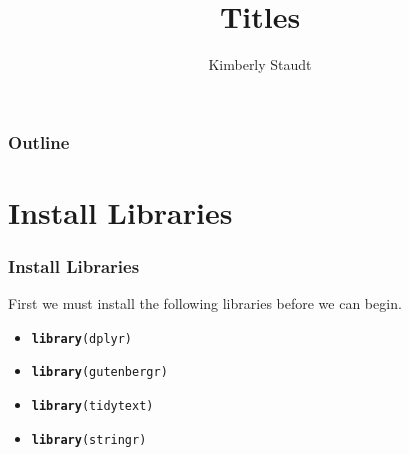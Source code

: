 \documentclass{beamer}\usepackage[]{graphicx}\usepackage[]{color}
\makeatletter
\newcommand{\hlstd}[1]{\textcolor[rgb]{0.345,0.345,0.345}{#1}}%
\newcommand{\hlkwd}[1]{\textcolor[rgb]{0.737,0.353,0.396}{\textbf{#1}}}%
\newenvironment{kframe}{%
 \def\at@end@of@kframe{}%
 \ifinner\ifhmode%
  \def\at@end@of@kframe{\end{minipage}}%
  \begin{minipage}{\columnwidth}%
 \fi\fi%
 \def\FrameCommand##1{\hskip\@totalleftmargin \hskip-\fboxsep
 \colorbox{shadecolor}{##1}\hskip-\fboxsep
     \hskip-\linewidth \hskip-\@totalleftmargin \hskip\columnwidth}%
 \MakeFramed {\advance\hsize-\width
   \@totalleftmargin\z@ \linewidth\hsize
   \@setminipage}}%
 {\par\unskip\endMakeFramed%
 \at@end@of@kframe}
\newenvironment{knitrout}{}{} %
\makeatother
\begin{document}
\title{Titles}
\author{Kimberly Staudt}

\begin{frame}
  \titlepage
\end{frame}

\begin{frame}
  \frametitle{Outline}
    \tableofcontents
\end{frame}


\section{Install Libraries}
\begin{frame}[fragile]
  \frametitle{Install Libraries}

First we must install the following libraries before we can begin. 
    \begin{itemize}
      \item
\begin{knitrout}
\color{fgcolor}\begin{kframe}
\begin{alltt}
\hlkwd{library}\hlstd{(dplyr)}
\end{alltt}
\end{kframe}
\end{knitrout}
      \item
\begin{knitrout}
\color{fgcolor}\begin{kframe}
\begin{alltt}
\hlkwd{library}\hlstd{(gutenbergr)}
\end{alltt}
\end{kframe}
\end{knitrout}
    \item
\begin{knitrout}
\color{fgcolor}\begin{kframe}
\begin{alltt}
\hlkwd{library}\hlstd{(tidytext)}
\end{alltt}
\end{kframe}
\end{knitrout}
    \item
\begin{knitrout}
\color{fgcolor}\begin{kframe}
\begin{alltt}
\hlkwd{library}\hlstd{(stringr)}

\end{alltt}
\end{kframe}
\end{knitrout}
\end{itemize}
\end{frame}
\end{document}
